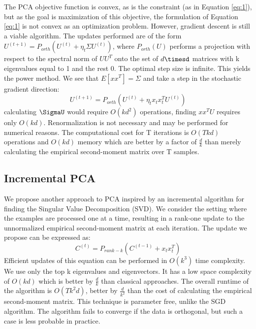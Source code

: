 \documentclass{article}
\begin{document}
The PCA objective function is convex, as is the constraint (as in Equation \ref{eq:1}), but as the goal is maximization of this objective, the formulation of Equation \ref{eq:1} is not convex as an optimization problem. However, gradient descent is still a viable algorithm. The updates performed are of the form $U^{\left( t+1\right) }=P_{orth}\left( U^{\left( t\right) }+\eta _{t}\Sigma U^{\left( t\right) }\right)$, where $P_{orth}(U)$ performs a projection with respect to the spectral norm of $UU^{T}$ onto the set of $d\timesd$ matrices with k eigenvalues equal to 1 and the rest 0. The optimal step size is infinite. This yields the power method. We see that $E\left[ xx^{T}\right] =\Sigma $ and take a step in the stochastic gradient direction:
\begin{equation}
U^{\left( t+1\right) }=P_{orth}\left( U^{\left( t\right) }+\eta _{t}x_{t}x^{T}_{t}U^{\left( t\right) }\right) 
\end{equation}
calculating $\SigmaU$ would require $O\left( kd^{2}\right)$ operations, finding $xx^{T}U$ requires only $O\left( kd\right)$. Renormalization is not necessary and may be performed for numerical reasons. The computational cost for T iterations is $O\left(Tkd\right)$ operations and $O\left(kd\right)$ memory which are better by a factor of $\frac{d}{k}$ than merely calculating the empirical second-moment matrix over T samples.

\subsection{Incremental PCA}
We propose another approach to PCA inspired by an incremental algorithm for finding the Singular Value Decomposition (SVD). We consider the setting where the examples are processed one at a time, resulting in a rank-one update to the unnormalized empirical second-moment matrix at each iteration. The update we propose can be expressed as:
\begin{equation}\label{eq:2} 
    C^{\left( t\right) }=P_{rank-k}\left( C^{\left( t-1\right) }+x_{t}x^{T}_{t}\right) 
\end{equation}
Efficient updates of this equation can be performed in $O\left( k^{3}\right)$ time complexity. We use only the top k eigenvalues and eigenvectors. It has a low space complexity of $O\left( kd\right)$ which is better by $\frac{d}{k}$ than classical approaches. The overall runtime of the algorithm is $O\left( Tk^{2}d\right)$, better by $\frac{d}{k^{2}}$ than the cost of calculating the empirical second-moment matrix. This technique is parameter free, unlike the SGD algorithm. The algorithm fails to converge if the data is orthogonal, but such a case is less probable in practice.
\end{document}
